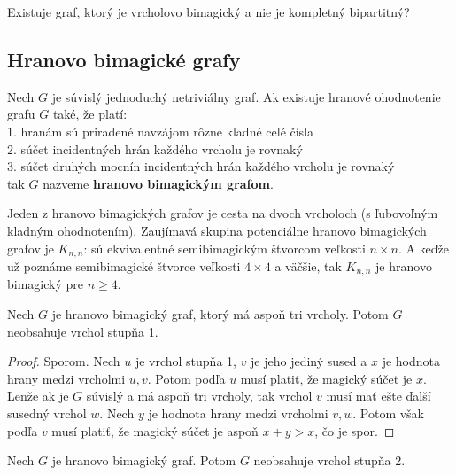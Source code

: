 \begin{subhypothesis} Existuje graf, ktorý je vrcholovo bimagický a nie je kompletný bipartitný?
\end{subhypothesis}



\subsection{Hranovo bimagické grafy}

\begin{subdefinition} Nech $G$ je súvislý jednoduchý netriviálny graf. Ak existuje hranové ohodnotenie grafu $G$ také, že platí: \\
1. hranám sú priradené navzájom rôzne kladné celé čísla \\
2. súčet incidentných hrán každého vrcholu je rovnaký \\
3. súčet druhých mocnín incidentných hrán každého vrcholu je rovnaký \\
tak $G$ nazveme \textbf{hranovo bimagickým grafom}.
\end{subdefinition} 

Jeden z hranovo bimagických grafov je cesta na dvoch vrcholoch (s ľubovoľným kladným ohodnotením). Zaujímavá skupina potenciálne hranovo bimagických grafov je $K _{n,n}$: sú ekvivalentné semibimagickým štvorcom veľkosti $n \times n$. A keďže už poznáme semibimagické štvorce veľkosti $4 \times 4$ a väčšie, tak $K _{n,n}$ je hranovo bimagický pre $n \geq 4$.  \\

\begin{subtheorem} Nech $G$ je hranovo bimagický graf, ktorý má aspoň tri vrcholy. Potom $G$ neobsahuje vrchol stupňa 1.
\end{subtheorem}

\begin{proof} Sporom. Nech $u$ je vrchol stupňa 1, $v$ je jeho jediný sused a $x$ je hodnota hrany medzi vrcholmi $u,v$. Potom podľa $u$ musí platiť, že magický súčet je $x$. Lenže ak je $G$ súvislý a má aspoň tri vrcholy, tak vrchol $v$ musí mať ešte ďalší susedný vrchol $w$. Nech $y$ je hodnota hrany medzi vrcholmi $v,w$. Potom však podľa $v$ musí platiť, že magický súčet je aspoň $x + y > x$, čo je spor.
\end{proof} 

\begin{subtheorem} Nech $G$ je hranovo bimagický graf. Potom $G$ neobsahuje vrchol stupňa 2.
\end{subtheorem}

